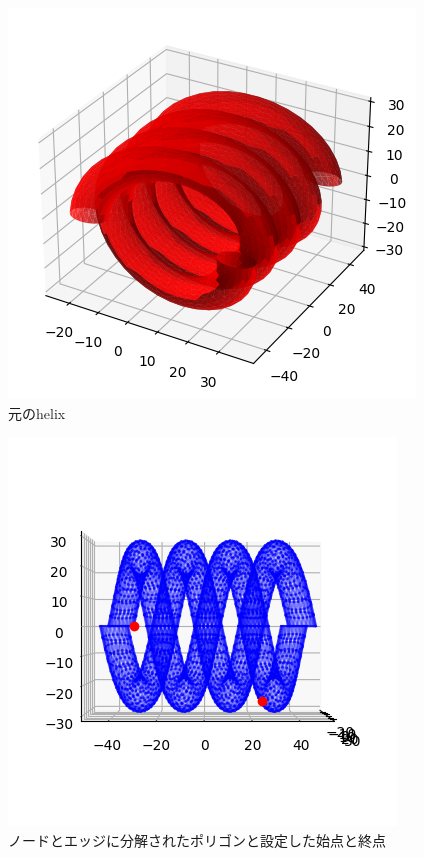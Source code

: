 \documentclass[a4paper,11pt]{jsarticle}
\begin{document}
\begin{figure}[H]
  \centering
  \includegraphics[scale = 1.0]{../Figs/red-helix.png}
  \caption{元のhelix}
  \label{red-helix}
\end{figure}

\begin{figure}[H]
  \centering
  \includegraphics[scale = 1.0]{../Figs/helix-0to634-endpoints.png}
  \caption{ノードとエッジに分解されたポリゴンと設定した始点と終点}
  \label{helix-endpoints}
\end{figure}
\end{document}
